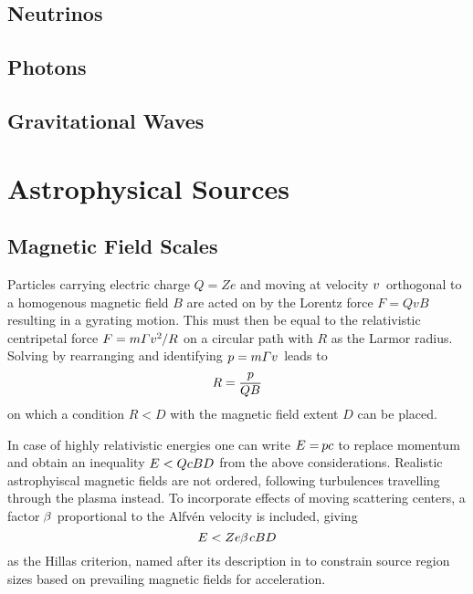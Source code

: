 \subsection{Neutrinos}
\label{sub:neutrinos}



\subsection{Photons}
\label{sub:photons}



\subsection{Gravitational Waves}
\label{sub:gravitational}



\section{Astrophysical Sources}
\label{sec:sources}



\subsection{Magnetic Field Scales}
\label{sub:fields}

Particles carrying electric charge $Q = Ze$ and moving at velocity $v \kern+1.0pt$ orthogonal to a homogenous magnetic field $B$ are
acted on by the Lorentz force $F = QvB$ resulting in a gyrating motion. This must then be equal to the relativistic centripetal force
$F = m \varGamma v^2 \kern-0.5pt / R$ on a circular path with $R$ as the Larmor radius. Solving by rearranging and identifying
$p = m \varGamma v \kern+0.5pt$ leads to
\begin{equation*}
	R = \frac{p}{\raisebox{0.3ex}{$QB \kern+0.3pt$}}
\end{equation*}
on which a condition $R < D$ with the magnetic field extent $D$ can be placed.


\newpage


In case of highly relativistic energies one can write $E = \kern-0.8pt pc$ to replace momentum and obtain an inequality
$E < QcBD \kern+0.5pt$ from the above considerations. Realistic astrophyiscal magnetic fields are not ordered, following
turbulences travelling through the plasma instead. To incorporate effects of moving scattering centers, a factor
$\kern-0.5pt \beta \kern+0.5pt$ proportional to the Alfvén velocity is included, giving
\begin{equation}
	E < Ze \kern-0.3pt \beta \kern+0.9pt cBD
	\label{eqn:hillas}
\end{equation}
as the Hillas criterion, named after its description in \cite{Hillas_1984} to constrain source region sizes based on prevailing
magnetic fields for  acceleration.



